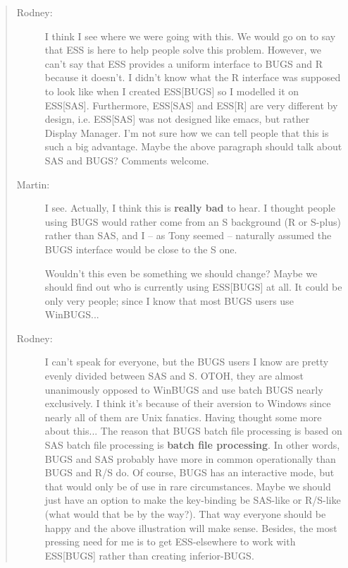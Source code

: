 \documentclass{article}
\newenvironment{Comment}{\begin{quote}\small\itshape }{\end{quote}}
\begin{document}
\begin{Comment}
\begin{description}
 \item[Rodney:]  I think I see where we were going with this.  We would go on to
say that ESS is here to help people solve this problem.  However,
we can't say that ESS provides a uniform interface to BUGS and R because
it doesn't.  I didn't know what the R interface was supposed to look like
when I created ESS[BUGS] so I modelled it on ESS[SAS].  Furthermore,
ESS[SAS] and ESS[R] are very different by design, i.e. ESS[SAS] was not
designed like emacs, but rather Display Manager.  I'm not sure how we can tell
people that this is such a big advantage.  Maybe the above paragraph
should talk about SAS and BUGS?  Comments welcome.

\item[Martin:] I see. Actually, I think this is \textbf{really bad} to hear.
  I thought people using BUGS would rather come from an S background
  (R or S-plus) rather than SAS, and I -- as Tony seemed -- naturally
  assumed the BUGS interface would be close to the S one.

  Wouldn't this even be something we should change?  Maybe we should find
  out who is currently using ESS[BUGS] at all. It could be only very
  people; since I know that most BUGS users use WinBUGS...

\item[Rodney:]  I can't speak for everyone, but the BUGS users I know are
pretty evenly divided between SAS and S.  OTOH, they are almost 
unanimously opposed to WinBUGS and use batch BUGS nearly exclusively.
I think it's because of their aversion to Windows since nearly all of
them are Unix fanatics.  
Having thought some more about this...  The reason that BUGS batch file
processing is based on SAS batch file processing is \textbf{batch file processing}.
In other words, BUGS and SAS probably have more in common operationally
than BUGS and R/S do.  Of course, BUGS has an interactive mode, but that
would only be of use in rare circumstances.  Maybe we should just have an 
option to make the key-binding be SAS-like or R/S-like (what would that be 
by the way?).  That way everyone should be happy and the above illustration
will make sense.  Besides, the most pressing need for me is to get 
ESS-elsewhere to work with ESS[BUGS] rather than creating inferior-BUGS.
\end{description}
\end{Comment}
\end{document}
